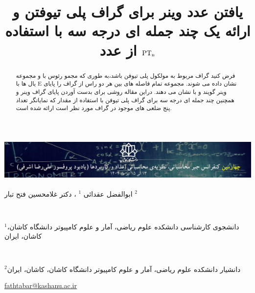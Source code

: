 \documentclass[Persian]{cacna2023-fa}
\begin{document}
		\begin{center}
		\includegraphics[height=2.2cm, width=14.7cm]{header-fa}
	\end{center}
	\vspace*{0.5cm}
	
	
	\title{یافتن عدد وینر برای گراف پلی تیوفتن و ارائه یک چند جمله ای درجه سه با استفاده از عدد ${\rm PT_n}$}
	\maketitle
	
	\begin{center}
		
		
		\begin{alphafootnotes}
			ابوالفضل عقدائی $^{1}$%
			 ،	دکتر غلامحسین فتح تبار $^{2}$%
			
			$^{}$%
			\\[2mm]
			{\small
				$^{1}$دانشجوی کارشناسی  دانشکده علوم ریاضی، آمار و علوم کامپیوتر دانشگاه کاشان، کاشان، ایران
				
			}
			\\[2mm]
			{\small
				$^{2}$دانشیار دانشکده علوم ریاضی، آمار و علوم کامپیوتر دانشگاه کاشان، کاشان، ایران
			
			
				\href{mailto:fathtabar@kashanu.ac.ir}{fathtabar@kashanu.ac.ir}
							}
		\\[2mm]
	
		\end{alphafootnotes}
			
	\end{center}

	
	
	\fancyhead[CO]{}
	\fancyhead[CE]{}

	


	\hrulefill
	\begin{abstract}
		فرض کنید  گراف مربوط به مولکول پلی تیوفن باشد،به طوری که مجمو رئوس با  و مجموعه یال ها با E  نشان داده می شوند. مجموعه تمام فاصله های بین هر دو راس از گراف  را پایای وینر گویند و با  نشان می دهند. دراین مقاله روشی برای بدست آوردن پایای گراف وینر و همچنین چند جمله ای درجه سه  برای گراف پلی تیوفن با استفاده از مقدار  که نمایانگر تعداد پنج ضلعی های موجود در گراف مورد نظر است ارائه شده است.
		
	\end{abstract}
\hrulefill
\end{document}
